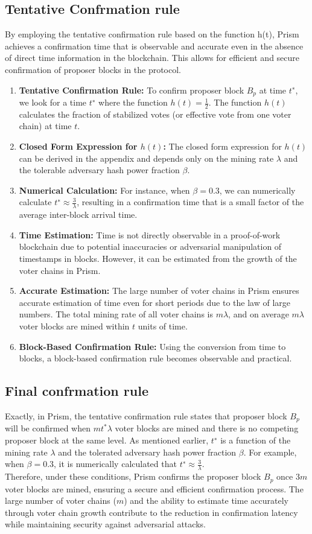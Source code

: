 \documentclass{report}
\begin{document}
\subsection{Tentative Confrmation rule}
By employing the tentative confirmation rule based on the function h(t), Prism achieves a confirmation time that is observable and accurate even in the absence of direct time information in the blockchain. This allows for efficient and secure confirmation of proposer blocks in the protocol.\\
\begin{enumerate}
	\item \textbf{Tentative Confirmation Rule:}  To confirm proposer block $B_{p}$ at time $t^{∗}$, we look for a time $t^{∗}$ where the function $h(t) = \frac{1}{2}$. The function $h(t)$ calculates the fraction of stabilized votes (or effective vote from one voter chain) at time $t$.
	\item \textbf{Closed Form Expression for $h(t)$:} The closed form expression for $h(t)$ can be derived in the appendix and depends only on the mining rate $\lambda$ and the tolerable adversary hash power fraction $\beta$.
	\item \textbf{Numerical Calculation:} For instance, when $\beta = 0.3$, we can numerically calculate $t^{∗} ≈ \frac{3}{\lambda}$, resulting in a confirmation time that is a small factor of the average inter-block arrival time.
	\item \textbf{Time Estimation:} Time is not directly observable in a proof-of-work blockchain due to potential inaccuracies or adversarial manipulation of timestamps in blocks. However, it can be estimated from the growth of the voter chains in Prism.
	\item \textbf{Accurate Estimation:} The large number of voter chains in Prism ensures accurate estimation of time even for short periods due to the law of large numbers. The total mining rate of all voter chains is $m\lambda$, and on average $m\lambda$ voter blocks are mined within $t$ units of time.
	\item \textbf{Block-Based Confirmation Rule:} Using the conversion from time to blocks, a block-based confirmation rule becomes observable and practical.
\end{enumerate}
\subsection{Final confrmation rule}
Exactly, in Prism, the tentative confirmation rule states that proposer block $B_{p}$ will be confirmed when $mt^{*}\lambda$ voter blocks are mined and there is no competing proposer block at the same level. As mentioned earlier, $t^{∗}$ is a function of the mining rate $\lambda$ and the tolerated adversary hash power fraction $\beta$. For example, when $\beta = 0.3$, it is numerically calculated that $t^{∗} ≈ \frac{3}{\lambda}$.\\
Therefore, under these conditions, Prism confirms the proposer block $B_{p}$ once $3m$ voter blocks are mined, ensuring a secure and efficient confirmation process. The large number of voter chains ($m$) and the ability to estimate time accurately through voter chain growth contribute to the reduction in confirmation latency while maintaining security against adversarial attacks.
\end{document}
